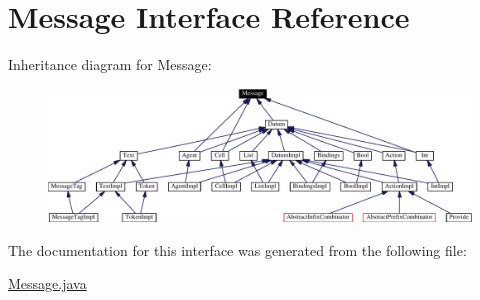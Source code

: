 \hypertarget{interfaceMessage}{
\section{Message  Interface Reference}
\label{interfaceMessage}
}
Inheritance diagram for Message:\begin{figure}[H]
\begin{center}
\leavevmode
\includegraphics[width=359pt]{interfaceMessage__inherit__graph}
\end{center}
\end{figure}


The documentation for this interface was generated from the following file:\begin{CompactItemize}
\item 
\hyperlink{Message_8java-source}{Message.java}\end{CompactItemize}
